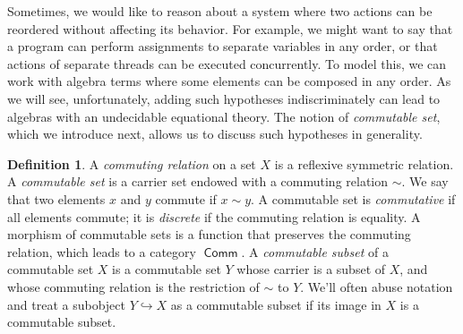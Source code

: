 \documentclass[11pt,a4paper]{amsart}
\newif\iffull\fullfalse
\theoremstyle{definition}
\newtheorem{definition}[theorem]{Definition}
\DeclareMathOperator{\Comm}{\mathsf{Comm}}
\begin{document}
Sometimes, we would like to reason about a system where two actions can be
reordered without affecting its behavior.  For example, we might want to say
that a program can perform assignments to separate variables in any order, or
that actions of separate threads can be executed concurrently.  To model this,
we can work with algebra terms where some elements can be composed in any order.
As we will see, unfortunately, adding such hypotheses indiscriminately can lead
to algebras with an undecidable equational theory.  The notion of
\emph{commutable set}, which we introduce next, allows us to discuss such
hypotheses in generality.

\begin{definition}
  \label{def:comm}
  A \emph{commuting relation} on a set $X$ is a reflexive symmetric relation.  A
  \emph{commutable set} is a carrier set endowed with a commuting relation
  $ \sim $.  We say that two elements $x$ and $y$ commute if $x \sim y$.  A
  commutable set is \emph{commutative} if all elements commute; it is
  \emph{discrete} if the commuting relation is equality.  A morphism of
  commutable sets is a function that preserves the commuting relation, which
  leads to a category $\Comm$.  A \emph{commutable subset} of a commutable set
  $X$ is a commutable set $Y$ whose carrier is a subset of $X$, and whose
  commuting relation is the restriction of $\sim$ to $Y$. %
  \iffull{}%
    A commutable subset of $X$ is the same thing as a regular subobject of $X$
    in $\Comm$---i.e., it is the equalizer of a pair of maps; more precisely,
    the obvious maps into the two-element set.%
  \fi{}%
  We'll often abuse notation and treat a subobject $Y \hookrightarrow X$ as a
  commutable subset if its image in $X$ is a commutable subset.
\end{definition}
\end{document}
